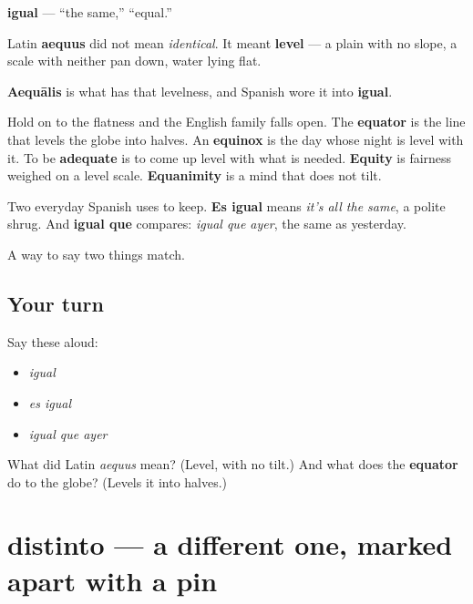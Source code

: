 \begin{cousinweb}
\textbf{igual} — \textquotedblleft{}the same,\textquotedblright{} \textquotedblleft{}equal.\textquotedblright{}

Latin \textbf{aequus} did not mean \emph{identical}. It meant \textbf{level} — a plain with no slope, a scale with neither pan down, water lying flat.

\textbf{Aequālis} is what has that levelness, and Spanish wore it into \textbf{igual}.

Hold on to the flatness and the English family falls open. The \textbf{equator} is the line that levels the globe into halves. An \textbf{equinox} is the day whose night is level with it. To be \textbf{adequate} is to come up level with what is needed. \textbf{Equity} is fairness weighed on a level scale. \textbf{Equanimity} is a mind that does not tilt.

Two everyday Spanish uses to keep. \textbf{Es igual} means \emph{it's all the same}, a polite shrug. And \textbf{igual que} compares: \emph{igual que ayer}, the same as yesterday.
\end{cousinweb}

\begin{grammarlens}[title={What you've built}]
A way to say two things match.
\end{grammarlens}

\subsection*{Your turn}
Say these aloud:

\begin{itemize}
\raggedright
  \item \emph{igual}
  \item \emph{es igual}
  \item \emph{igual que ayer}
\end{itemize}

\begin{tcolorbox}[breakable,colback=teal!4,colframe=teal!35!black,title={Before you move on}]
What did Latin \emph{aequus} mean? (Level, with no tilt.) And what does the \textbf{equator} do to the globe? (Levels it into halves.)
\end{tcolorbox}
\section[distinto]{distinto — a different one, marked apart with a pin}

